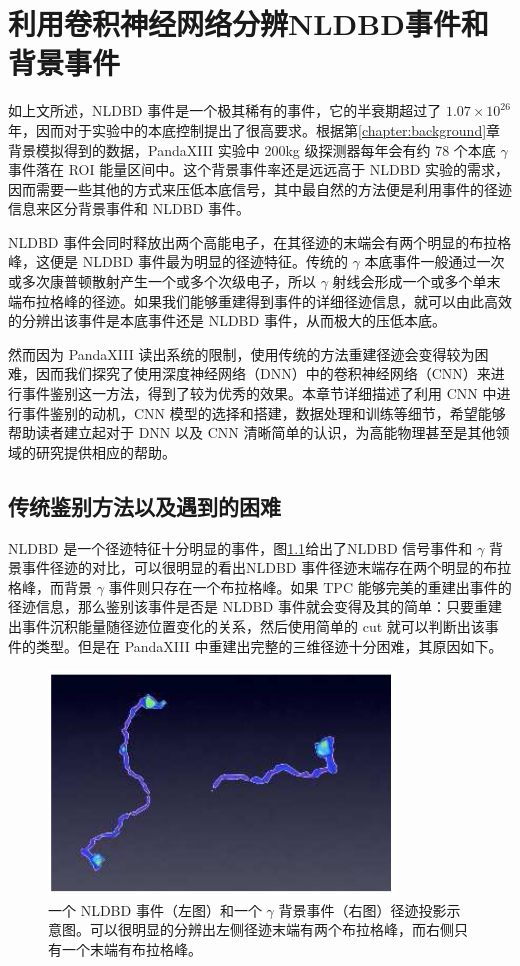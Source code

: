 
\chapter{利用卷积神经网络分辨NLDBD事件和背景事件}
\label{chapter:cnn}

如上文所述，NLDBD 事件是一个极其稀有的事件，它的半衰期超过了 $1.07\times10^{26}$ 年，因而对于实验中的本底控制提出了很高要求。根据第\ref{chapter:background}章背景模拟得到的数据，PandaXIII 实验中 200kg 级探测器每年会有约 78 个本底 $\gamma$ 事件落在 ROI 能量区间中。这个背景事件率还是远远高于 NLDBD 实验的需求，因而需要一些其他的方式来压低本底信号，其中最自然的方法便是利用事件的径迹信息来区分背景事件和 NLDBD 事件。

NLDBD 事件会同时释放出两个高能电子，在其径迹的末端会有两个明显的布拉格峰，这便是 NLDBD 事件最为明显的径迹特征。传统的 $\gamma$ 本底事件一般通过一次或多次康普顿散射产生一个或多个次级电子，所以 $\gamma$ 射线会形成一个或多个单末端布拉格峰的径迹。如果我们能够重建得到事件的详细径迹信息，就可以由此高效的分辨出该事件是本底事件还是 NLDBD 事件，从而极大的压低本底。

然而因为 PandaXIII 读出系统的限制，使用传统的方法重建径迹会变得较为困难，因而我们探究了使用深度神经网络（DNN）中的卷积神经网络（CNN）来进行事件鉴别这一方法，得到了较为优秀的效果。本章节详细描述了利用 CNN 中进行事件鉴别的动机，CNN 模型的选择和搭建，数据处理和训练等细节，希望能够帮助读者建立起对于 DNN 以及 CNN 清晰简单的认识，为高能物理甚至是其他领域的研究提供相应的帮助。

\section{传统鉴别方法以及遇到的困难}

NLDBD 是一个径迹特征十分明显的事件，图\ref{fig:samples}给出了NLDBD 信号事件和 $\gamma$ 背景事件径迹的对比，可以很明显的看出NLDBD 事件径迹末端存在两个明显的布拉格峰，而背景 $\gamma$ 事件则只存在一个布拉格峰。如果 TPC 能够完美的重建出事件的径迹信息，那么鉴别该事件是否是 NLDBD 事件就会变得及其的简单：只要重建出事件沉积能量随径迹位置变化的关系，然后使用简单的 cut 就可以判断出该事件的类型。但是在 PandaXIII 中重建出完整的三维径迹十分困难，其原因如下。

\begin{figure}[hbt]
    \centering
    \includegraphics[width=0.5\columnwidth]{pic/fig10.png}
    \caption{一个 NLDBD 事件（左图）和一个 $\gamma$ 背景事件（右图）径迹投影示意图。可以很明显的分辨出左侧径迹末端有两个布拉格峰，而右侧只有一个末端有布拉格峰。}
    \label{fig:samples}
\end{figure}

